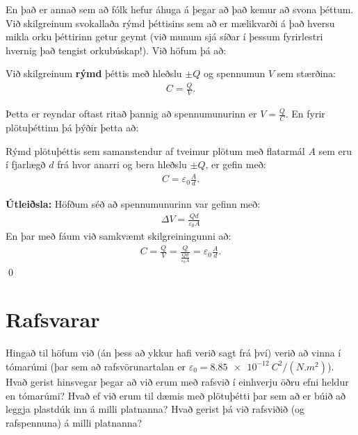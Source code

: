 En það er annað sem að fólk hefur áhuga á þegar að það kemur að svona þéttum. Við skilgreinum svokallaða rýmd þéttisins sem að er mælikvarði á það hversu mikla orku þéttirinn getur geymt (við munum sjá síðar í þessum fyrirlestri hvernig það tengist orkubúskap!). Við höfum þá að:
\begin{tcolorbox}
\begin{definition}
Við skilgreinum \textbf{rýmd} þéttis með hleðslu $\pm Q$ og spennumun $V$ sem stærðina:
\begin{align*}
    C = \frac{Q}{V}.
\end{align*}
\end{definition}
\end{tcolorbox}
Þetta er reyndar oftast ritað þannig að spennumunurinn er $V = \frac{Q}{C}$. En fyrir plötuþéttinn þá þýðir þetta að:
\begin{tcolorbox}
\begin{theorem}
Rýmd plötuþéttis sem samanstendur af tveimur plötum með flatarmál $A$ sem eru í fjarlægð $d$ frá hvor anarri og bera hleðslu $\pm Q$, er gefin með:
\begin{align*}
     C = \varepsilon_0 \frac{A}{d}.
\end{align*}
\end{theorem}
\end{tcolorbox}

\textbf{Útleiðsla:} Höfðum séð að spennumunurinn var gefinn með:
\begin{align*}
    \Delta V = \frac{Qd}{\varepsilon_0 A}
\end{align*}
En þar með fáum við samkvæmt skilgreiningunni að:
\begin{align*}
    C = \frac{Q}{V} = \frac{Q}{\frac{Qd}{\varepsilon_0 A}} = \varepsilon_0 \frac{A}{d}.
\end{align*}
\qed


\section{Rafsvarar}

Hingað til höfum við (án þess að ykkur hafi verið sagt frá því) verið að vinna í tómarúmi (þar sem að rafsvörunartalan er $\varepsilon_0 = \SI{8.85e-12}{C^2/(N.m^2)}$). Hvað gerist hinsvegar þegar að við erum með rafsvið í einhverju öðru efni heldur en tómarúmi? Hvað ef við erum til dæmis með plötuþétti þar sem að er búið að leggja plastdúk inn á milli platnanna? Hvað gerist þá við rafsviðið (og rafspennuna) á milli platnanna? 

